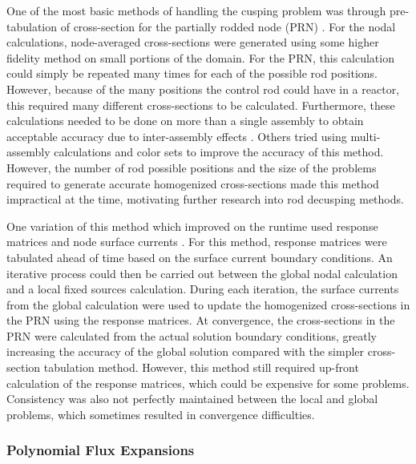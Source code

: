 One of the most basic methods of handling the cusping problem was through pre-tabulation of cross-section for the partially rodded node (PRN) \cite{HanSemJooThesis1984}.  For the nodal calculations, node-averaged cross-sections were generated using some higher fidelity method on small portions of the domain.  For the PRN, this calculation could simply be repeated many times for each of the possible rod positions.  However, because of the many positions the control rod could have in a reactor, this required many different cross-sections to be calculated.  Furthermore, these calculations needed to be done on more than a single assembly to obtain acceptable accuracy due to inter-assembly effects \cite{KordSmithThesis1980spatial}.  Others tried using multi-assembly calculations \cite{hoxieThesis1982application} and color sets \cite{khalilThesis1983application} to improve the accuracy of this method.  However, the number of rod possible positions and the size of the problems required to generate accurate homogenized cross-sections made this method impractical at the time, motivating further research into rod decusping methods.

One variation of this method which improved on the runtime used response matrices and node surface currents \cite{chengThesis1981homogenizationResponseMatrix,finckThesis1982homogenizationResponseMatrix}.  For this method, response matrices were tabulated ahead of time based on the surface current boundary conditions.  An iterative process could then be carried out between the global nodal calculation and a local fixed sources calculation.  During each iteration, the surface currents from the global calculation were used to update the homogenized cross-sections in the PRN using the response matrices.  At convergence, the cross-sections in the PRN were calculated from the actual solution boundary conditions, greatly increasing the accuracy of the global solution compared with the simpler cross-section tabulation method.  However, this method still required up-front calculation of the response matrices, which could be expensive for some problems.  Consistency was also not perfectly maintained between the local and global problems, which sometimes resulted in convergence difficulties.

\subsubsection{Polynomial Flux Expansions}

